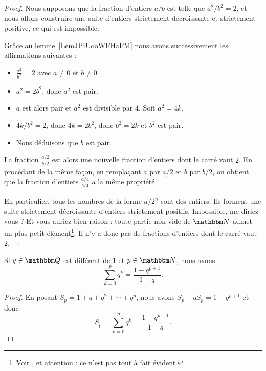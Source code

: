 \begin{proof}
    Nous supposons que la fraction d'entiers \( a/b\) est telle que \( a^2/b^2=2\), et nous allons construire une suite d'entiers strictement décroissante et strictement positive, ce qui est impossible.

    Grâce au lemme~\ref{LemJPIUooWFHaFM} nous avons successivement les affirmations suivantes :
    \begin{itemize}
        \item
        \(\frac{ a^2 }{ b^2 }=2 \)  avec \( a\neq 0\) et \( b\neq 0\).
    \item
        \( a^2=2b^2\), donc \( a^2\) est pair.
    \item
        \( a\) est alors pair et \( a^2\) est divisible par \( 4\). Soit \( a^2=4k\).
    \item
        \( 4k/b^2=2\), donc \( 4k=2b^2\), donc \( b^2=2k\) et \( b^2\) est pair.
    \item
        Nous déduisons que \( b\) est pair.
    \end{itemize}
    La fraction \( \frac{ a/2 }{ b/2 }\) est alors une nouvelle fraction d'entiers dont le carré vaut $2$. En procédant de la même façon, en remplaçant \( a\) par \( a/2\) et \( b\) par \( b/2\), on obtient que la fraction d'entiers \( \frac{ a/4 }{ b/4 }\) a la même propriété.

    En particulier, tous les nombres de la forme \( a/2^n\) sont des entiers.  Ils forment une suite strictement décroissante d'entiers strictement positifs. Impossible, me diriez-vous ? Et vous auriez bien raison : toute partie non vide de \( \eN\) admet un plus petit élément\footnote{Voir \cite{RWWJooJdjxEK}, et attention : ce n'est pas tout à fait évident.}. Il n'y a donc pas de fractions d'entiers dont le carré vaut \( 2\).
\end{proof}

\begin{lemma}      \label{LEMooOTVUooImvusn}
    Si \( q\in \eQ\) est différent de \( 1 \) et \( p\in \eN\), nous avons
    \begin{equation}
        \sum_{k=0}^pq^k=\frac{ 1-q^{p+1} }{ 1-q }.
    \end{equation}
\end{lemma}

\begin{proof}
    En posant \( S_p=1+q+q^2+\cdots +q^{p}\), nous avons $S_p-qS_p=1-q^{p+1}$ et donc
    \begin{equation}
        S_p=\sum_{k=0}^pq^k=\frac{ 1-q^{p+1} }{ 1-q }.
    \end{equation}
\end{proof}

